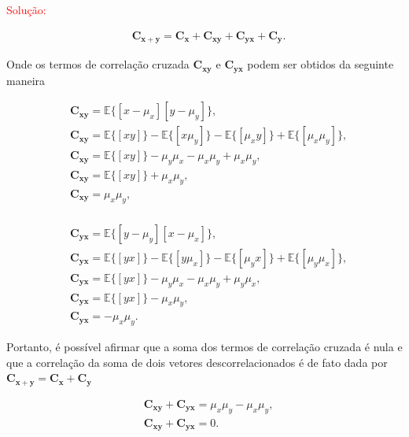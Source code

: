 \documentclass[a4paper,10pt]{article}
\begin{document}
\begin{enumerate}
\begin{enumerate}
						\textcolor{red}{Solução:}
						
						\begin{align}
							&\mathbf{C}_{\mathbf{x} + \mathbf{y}} = \mathbf{C}_{\mathbf{x}} + \mathbf{C}_{\mathbf{xy}} + \mathbf{C}_{\mathbf{yx}} + \mathbf{C}_{\mathbf{y}}.
						\end{align}
						
						Onde os termos de correlação cruzada $\mathbf{C}_{\mathbf{xy}}$ e $\mathbf{C}_{\mathbf{yx}}$ podem ser obtidos  da seguinte maneira
						
						\begin{align}
							&\mathbf{C_{xy}} = \mathbb{E}\{[x - \mu_{x}][y - \mu_{y}]\}, \\
							&\mathbf{C_{xy}} = \mathbb{E}\{[xy]\} - \mathbb{E}\{[x\mu_{y}]\} - \mathbb{E}\{[\mu_{x} y]\} + \mathbb{E}\{[\mu_{x} \mu_{y}]\}, \\
							&\mathbf{C_{xy}} = \mathbb{E}\{[xy]\} - \mu_{y} \mu_{x} - \mu_{x} \mu_{y} + \mu_{x} \mu_{y}, \\
							&\mathbf{C_{xy}} = \mathbb{E}\{[xy]\} + \mu_{x} \mu_{y}, \\
							&\mathbf{C_{xy}} = \mu_{x} \mu_{y}, \\
						\end{align}
						
						\begin{align}
							&\mathbf{C_{yx}} = \mathbb{E}\{[y - \mu_{y}][x - \mu_{x}]\}, \\
							&\mathbf{C_{yx}} = \mathbb{E}\{[yx]\} - \mathbb{E}\{[y\mu_{x}]\} - \mathbb{E}\{[\mu_{y} x]\} + \mathbb{E}\{[\mu_{y} \mu_{x}]\}, \\
							&\mathbf{C_{yx}} = \mathbb{E}\{[yx]\} - \mu_{y} \mu_{x} - \mu_{x} \mu_{y} + \mu_{y} \mu_{x}, \\
							&\mathbf{C_{yx}} = \mathbb{E}\{[yx]\} - \mu_{x} \mu_{y}, \\
							&\mathbf{C_{yx}} = - \mu_{x} \mu_{y}.
						\end{align}
						
						Portanto, é possível afirmar que a soma dos termos de correlação cruzada é nula e que a correlação da soma de dois vetores descorrelacionados é de fato 
						dada por $\mathbf{C}_{\mathbf{x} + \mathbf{y}} = \mathbf{C}_{\mathbf{x}} + \mathbf{C}_{\mathbf{y}}$
						
						\begin{align}
							&\mathbf{C_{xy}} + \mathbf{C_{yx}}  = \mu_{x} \mu_{y} - \mu_{x} \mu_{y}, \\
							&\mathbf{C_{xy}} + \mathbf{C_{yx}}  = 0.
						\end{align}
					

\end{enumerate}
\end{enumerate}
\end{document}
